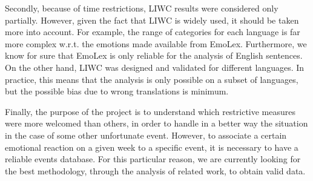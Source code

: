 Secondly, because of time restrictions, LIWC results were considered only partially. However, given the fact that LIWC is widely used, it should be taken more into account. For example, the range of categories for each language is far more complex w.r.t. the emotions made available from EmoLex. Furthermore, we know for sure that EmoLex is only reliable for the analysis of English sentences. On the other hand, LIWC was designed and validated for different languages. In practice, this means that the analysis is only possible on a subset of languages, but the possible bias due to wrong translations is minimum.

Finally, the purpose of the project is to understand which restrictive measures were more welcomed than others, in order to handle in a better way the situation in the case of some other unfortunate event. However, to associate a certain emotional reaction on a given week to a specific event, it is necessary to have a reliable events database. For this particular reason, we are currently looking for the best methodology, through the analysis of related work, to obtain valid data. 